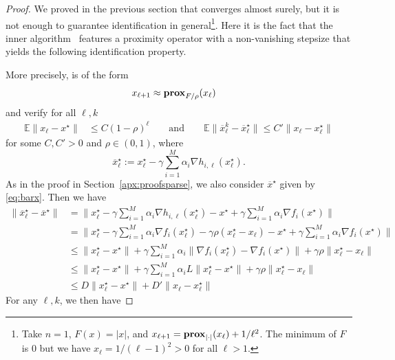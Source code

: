 \begin{proof}
We proved in the previous section that \recoalgo converges almost surely, but it is not enough to guarantee identification in general\footnote{Take $n=1$, $F(x) = |x|$, and $x_{\ell+1} = \mathbf{prox}_{|\cdot|}(x_\ell) + 1/\ell^2$. The minimum of $F$ is $0$ but we have $x_\ell = 1/(\ell-1)^2>0$ for all $\ell>1$.}. Here it is the fact that the inner algorithm \spyI~features a proximity operator with a non-vanishing stepsize that yields the following identification property. 

More precisely, \recoalgo is of the form 
\begin{align*}
    x_{\ell+1} &\approx \mathbf{prox}_{F/\rho}(x_\ell)
\end{align*}
and verify for all $\ell,k$
\begin{align*}
    \mathbb{E} \|x_{\ell} - x^\star \| &\leq C (1-\rho)^\ell
    \qquad\text{and}\qquad
    \mathbb{E} \|\overline{x}^k_{\ell} - \overline{x}_\ell^\star \| \leq C'  \|x_{\ell} - x_\ell^\star \| 
\end{align*}
for some $C,C'>0$ and $\rho\in(0,1)$, where 
$$
\overline{x}_\ell^\star :=  {x}_\ell^\star - \gamma \sum_{i=1}^M \alpha_i \nabla h_{i,\ell}({x}_\ell^\star).
$$
As in the proof in Section~\ref{apx:proofsparse}, we also consider $\overline{x}^\star$ given by \eqref{eq:barx}. 
Then we have
\begin{align*}
    \|\overline{x}_\ell^\star - \overline{x}^\star\| &=    \|{x}_\ell^\star - \gamma \sum_{i=1}^M \alpha_i \nabla h_{i,\ell}({x}_\ell^\star) - {x}^\star + \gamma \sum_{i=1}^M \alpha_i \nabla f_i({x}^\star) \| \\ 
    &=  \|{x}_\ell^\star - \gamma \sum_{i=1}^M \alpha_i \nabla f_{i}({x}_\ell^\star) - \gamma \rho ({x}_\ell^\star - {x}_\ell) - {x}^\star + \gamma \sum_{i=1}^M \alpha_i \nabla f_i({x}^\star) \| \\ 
    &\leq  \|{x}_\ell^\star - {x}^\star\| + \gamma \sum_{i=1}^M \alpha_i  \|\nabla f_i({x}_\ell^\star) - \nabla f_i({x}^\star)\| + \gamma \rho \|{x}_\ell^\star - {x}_\ell\| \\
    &\leq  \|{x}_\ell^\star - {x}^\star\| + \gamma \sum_{i=1}^M \alpha_i L \|{x}_\ell^\star - {x}^\star\| + \gamma \rho \|{x}_\ell^\star - {x}_\ell\| \\
    &\leq  D \|{x}_\ell^\star - {x}^\star\|  + D' \|x_\ell - {x}^\star_\ell\|
\end{align*}
For any $\ell,k$, we then have

\end{proof}
